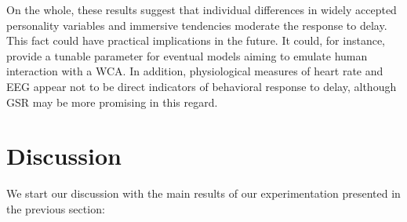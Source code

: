 \documentclass[10pt,letterpaper]{article}
\begin{document}
On the whole, these results suggest that individual differences in widely accepted personality variables and immersive tendencies moderate the response to delay.
This fact could have practical implications in the future.
It could, for instance, provide a tunable parameter for eventual models aiming to emulate human interaction with a WCA.\@
In addition, physiological measures of heart rate and EEG appear not to be direct indicators of  behavioral response to delay, although GSR may be more promising in this regard.

\section{Discussion}\label{sec:discussion}

We start our discussion with the main results of our experimentation presented in the previous section:
\end{document}
